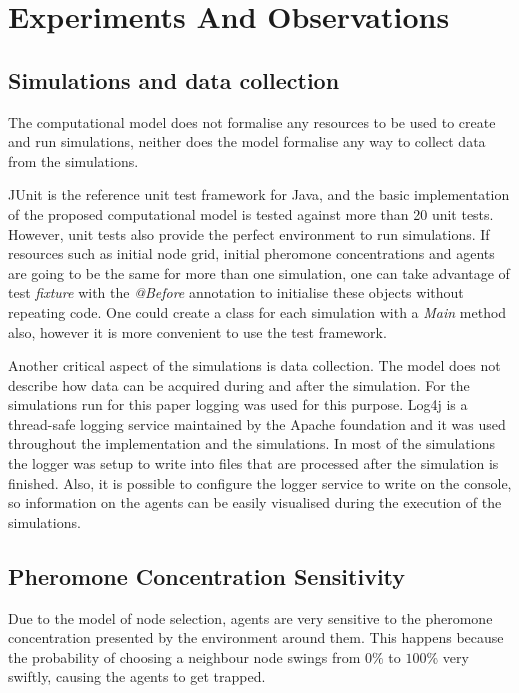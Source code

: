 \chapter{Experiments And Observations}
\label{ch:experiments-and-observations}

\section{Simulations and data collection}
\label{sec:running-sim}

The computational model does not formalise any resources to be used to create and run simulations, neither does the model formalise any way to collect data from the simulations.

JUnit is the reference unit test framework for Java, and the basic implementation of the proposed computational model is tested against more than 20 unit tests. However, unit tests also provide the perfect environment to run simulations. If resources such as initial node grid, initial pheromone concentrations and agents are going to be the same for more than one simulation, one can take advantage of test \emph{fixture} with the \emph{@Before} annotation to initialise these objects without repeating code. One could create a class for each simulation with a \emph{Main} method also, however it is more convenient to use the test framework.

Another critical aspect of the simulations is data collection. The model does not describe how data can be acquired during and after the simulation. For the simulations run for this paper logging was used for this purpose. Log4j is a thread-safe logging service maintained by the Apache foundation and it was used throughout the implementation and the simulations. In most of the simulations the logger was setup to write into files that are processed after the simulation is finished. Also, it is possible to configure the logger service to write on the console, so information on the agents can be easily visualised during the execution of the simulations.

\section{Pheromone Concentration Sensitivity}

Due to the model of node selection, agents are very sensitive to the pheromone concentration presented by the environment around them. This happens because the probability of choosing a neighbour node swings from $0\%$ to $100\%$ very swiftly, causing the agents to get trapped.

